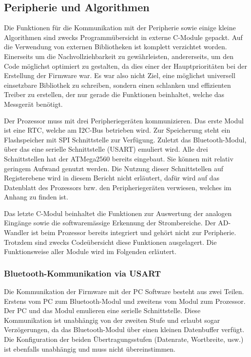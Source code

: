 \subsection{Peripherie und Algorithmen}

Die Funktionen für die Kommunikation mit der Peripherie sowie einige kleine Algorithmen sind zwecks Programmübersicht in externe C-Module gepackt. Auf die Verwendung von externen Bibliotheken ist komplett verzichtet worden. Einerseits um die Nachvollziehbarkeit zu gewährleisten, andererseits, um den Code möglichst optimiert zu gestalten, da dies einer der Hauptprioritäten bei der Erstellung der Firmware war. Es war also nicht Ziel, eine möglichst universell einsetzbare Bibliothek zu schreiben, sondern einen schlanken und effizienten Treiber zu erstellen, der nur gerade die Funktionen beinhaltet, welche das Messgerät benötigt.
 
Der Prozessor muss mit drei Peripheriegeräten kommunizieren. Das erste Modul ist eine RTC, welche am I2C-Bus betrieben wird. Zur Speicherung steht ein Flashspeicher mit SPI Schnittstelle zur Verfügung. Zuletzt das Bluetooth-Modul, über das eine serielle Schnittstelle (USART) emuliert wird. Alle drei Schnittstellen hat der ATMega2560 bereits eingebaut. Sie können mit relativ geringem Aufwand genutzt werden. Die Nutzung dieser Schnittstellen auf \glqq Registerebene\grqq{} wird in diesem Bericht nicht erläutert, dafür wird auf das Datenblatt des Prozessors bzw. den Peripheriegeräten verwiesen, welches im Anhang zu finden ist. 

Das letzte C-Modul beinhaltet die Funktionen zur Auswertung der analogen Eingänge sowie die softwaremässige Erkennung der Strombereiche. Der AD-Wandler ist beim Prozessor bereits integriert und gehört nicht zur Peripherie. Trotzdem sind zwecks Codeübersicht diese Funktionen ausgelagert. Die Funktionsweise aller Module wird im Folgenden erläutert.

\subsubsection*{Bluetooth-Kommunikation via USART}
Die Kommunikation der Firmware mit der PC Software besteht aus zwei Teilen. Erstens vom PC zum Bluetooth-Modul und zweitens vom Modul zum Prozessor. Der PC und das Modul emulieren eine serielle Schnittstelle. Diese Kommunikation ist unabhängig von der zweiten Stufe und erlaubt sogar Verzögerungen, da das Bluetooth-Modul über einen kleinen Datenbuffer verfügt. Die Konfiguration der beiden Übertragungsstufen (Datenrate, Wortbreite, usw.) ist ebenfalls unabhängig und muss nicht übereinstimmen.  


